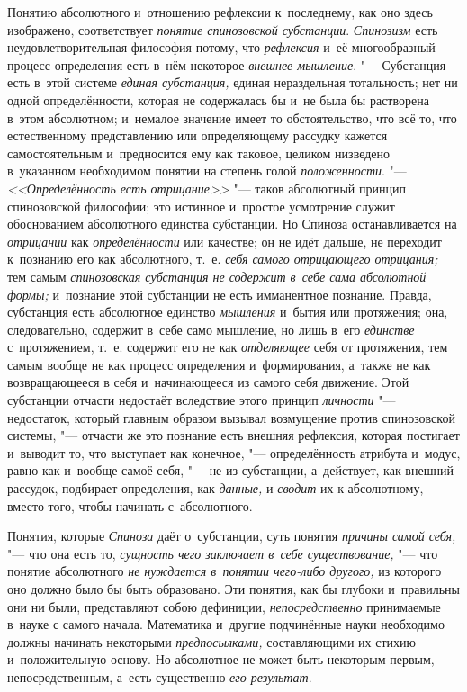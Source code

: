 Понятию абсолютного и~отношению рефлексии к~последнему, как оно здесь
изображено, соответствует {\em понятие спинозовской
субстанции}. {\em Спинозизм} есть неудовлетворительная
философия потому, что {\em рефлексия} и~её
многообразный процесс определения есть в~нём некоторое
{\em внешнее мышление}. "--- Субстанция есть в~этой
системе {\em единая субстанция,} единая нераздельная
тотальность; нет ни одной определённости, которая не содержалась бы и~не
была бы растворена в~этом абсолютном; и~немалое значение имеет то
обстоятельство, что всё то, что естественному представлению или
определяющему рассудку кажется самостоятельным и~предносится ему как
таковое, целиком низведено в~указанном необходимом понятии на степень голой
{\em положенности}. "--- {\em <<Определённость есть отрицание>>} "--- таков
абсолютный принцип спинозовской
философии;
это истинное и~простое усмотрение служит обоснованием абсолютного единства
субстанции. Но Спиноза останавливается на {\em отрицании} как
{\em определённости} или качестве; он не идёт дальше,
не переходит к~познанию его как абсолютного, т.~е.
{\em себя самого отрицающего отрицания;} тем самым
{\em спинозовская субстанция не содержит в~себе сама
абсолютной формы;} и~познание этой субстанции не есть имманентное познание.
Правда, субстанция есть абсолютное единство
{\em мышления} и~бытия или протяжения; она,
следовательно, содержит в~себе само мышление, но лишь в~его
{\em единстве} с~протяжением, т.~е. содержит его не как
{\em отделяющее} себя от протяжения, тем самым вообще
не как процесс определения и~формирования, а~также не как возвращающееся в
себя и~начинающееся из самого себя движение. Этой субстанции отчасти
недостаёт вследствие этого принцип {\em личности}
"--- недостаток, который главным образом вызывал возмущение против
спинозовской системы, "--- отчасти же это познание есть внешняя рефлексия,
которая постигает и~выводит то, что выступает как конечное, "---
определённость атрибута и~модус, равно как и~вообще самоё себя, "--- не из
субстанции, а~действует, как внешний рассудок, подбирает определения, как
{\em данные,} и {\em сводит} их к
абсолютному, вместо того, чтобы начинать с~абсолютного.

Понятия, которые {\em Спиноза} даёт о~субстанции, суть
понятия {\em причины самой себя,} "--- что она есть то,
{\em сущность чего заключает в~себе существование,} "---
что понятие абсолютного {\em не нуждается в~понятии
чего-либо другого,} из которого оно должно было бы быть образовано. Эти
понятия, как бы глубоки и~правильны они ни были, представляют собою
дефиниции, {\em непосредственно} принимаемые в~науке с
самого начала. Математика и~другие подчинённые науки необходимо должны
начинать некоторыми {\em предпосылками,} составляющими
их стихию и~положительную основу. Но абсолютное не может быть некоторым
первым, непосредственным, а~есть существенно {\em его
результат}.

